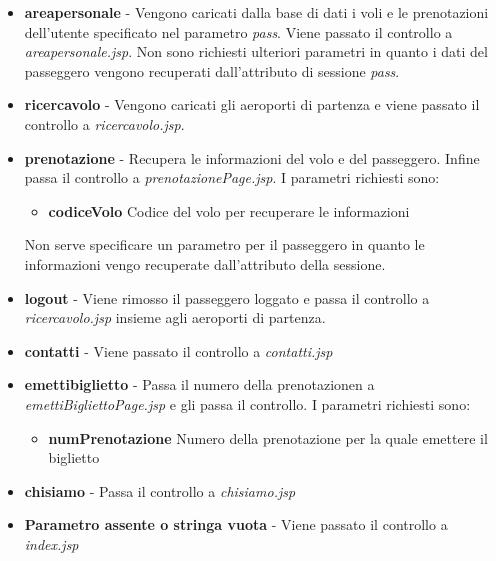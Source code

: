 \documentclass[a4paper,10pt]{article}
\begin{document}
\begin{itemize}
 \item \textbf{areapersonale} - Vengono caricati dalla base di dati i voli e le prenotazioni dell'utente specificato nel parametro \textit{pass}. Viene passato il controllo 
			a \textit{areapersonale.jsp}. Non sono richiesti ulteriori parametri in quanto i dati del passeggero vengono recuperati dall'attributo di sessione
			\textit{pass}.

 \item \textbf{ricercavolo} - Vengono caricati gli aeroporti di partenza e viene passato il controllo a \textit{ricercavolo.jsp}.


 \item \textbf{prenotazione} - Recupera le informazioni del volo e del passeggero. Infine passa il controllo a \textit{prenotazionePage.jsp}. 
				I parametri richiesti sono:
				\begin{itemize}
				 \item \textbf{codiceVolo} Codice del volo per recuperare le informazioni
				\end{itemize}
				
				Non serve specificare un parametro per il passeggero in quanto le informazioni vengo recuperate dall'attributo della sessione.



 \item \textbf{logout} - Viene rimosso il passeggero loggato e passa il controllo a \textit{ricercavolo.jsp} insieme agli aeroporti di partenza.


 \item \textbf{contatti} - Viene passato il controllo a \textit{contatti.jsp}
 \item \textbf{emettibiglietto} - Passa il numero della prenotazionen a \textit{emettiBigliettoPage.jsp} e gli passa il controllo. 
				  I parametri richiesti sono:
				   \begin{itemize}
				    \item \textbf{numPrenotazione} Numero della prenotazione per la quale emettere il biglietto
				   \end{itemize}


 \item \textbf{chisiamo} - Passa il controllo a \textit{chisiamo.jsp}
 \item \textbf{Parametro assente o stringa vuota} - Viene passato il controllo a \textit{index.jsp}
 \end{itemize}
 
\end{document}
